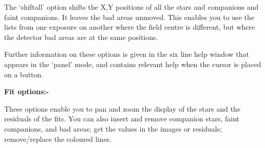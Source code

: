 \begin{small}
{{ The `shift{\undersc}all' option shifts the X,Y positions of all the stars
 and companions and faint companions. It leaves the bad areas unmoved.
 This enables you to use the lists from one exposure on another where
 the field centre is different, but where the detector bad areas are
 at the same positions.
 
 Further information on these options is given in the six line help
 window that appears in the `panel' mode, and contains relevant help
 when the cursor is placed on a button.
 
 {\bf \hspace*{2em} Fit options:-}
 
 These options enable you to pan and zoom the display of
 the stars and the residuals of the fits. You can also insert
 and remove companion stars, faint companions, and bad areas;
 get the values in the images or residuals; remove/replace the
 coloured lines.
 
}}
\end{small}
